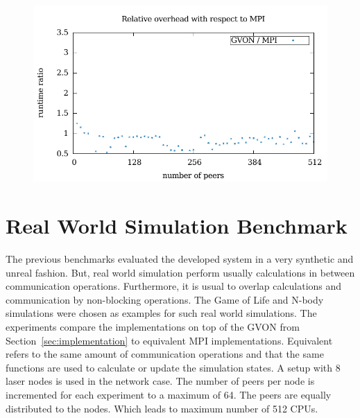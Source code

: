 \begin{figure}[H]
\begin{minipage}[t]{0.5\textwidth}
    \includegraphics[width=\textwidth]{plots/50_reduce_network_overhead_gvon_laser}
  \end{minipage}%
  \caption{ }
  \label{fig:reduce_laser}
\end{figure}


\section{Real World Simulation Benchmark}
\label{sec:eval:real}
The previous benchmarks evaluated the developed system in a very
synthetic and unreal fashion. But, real world simulation perform
usually calculations in between communication operations. Furthermore,
it is usual to overlap calculations and communication by non-blocking
operations. The Game of Life and N-body simulations were chosen as
examples for such real world simulations. The experiments compare the
implementations on top of the GVON from Section~\ref{sec:implementation} to
equivalent MPI implementations.  Equivalent refers to the same amount of
communication operations and that the same functions are used to calculate
or update the simulation states. A setup with 8 laser nodes is used in
the network case. The number of peers per node is incremented for each
experiment to a maximum of 64. The peers are equally distributed to
the nodes.  Which leads to maximum number of 512 CPUs. 


